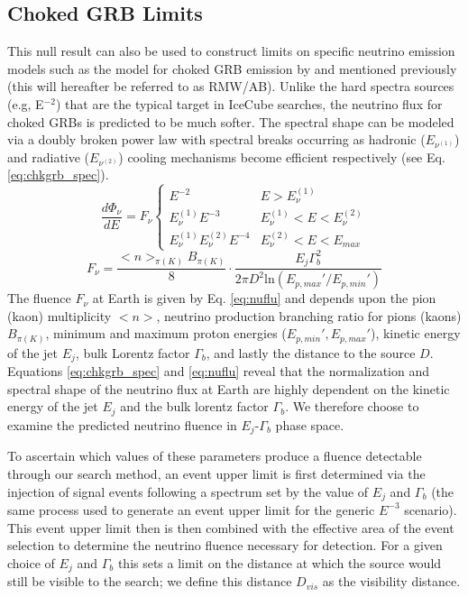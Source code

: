\documentclass[manuscript]{aastex}
\begin{document}
\subsection{Choked GRB Limits}
This null result can also be used to construct limits on specific neutrino emission models such as the model for choked GRB emission by \cite{2004PhRvL..93r1101R} and \cite{2005PhRvL..95f1103A} mentioned previously (this will hereafter be referred to as RMW/AB). Unlike the hard spectra sources (e.g, E$^{-2}$) that are the typical target in IceCube searches, the neutrino flux for choked GRBs is predicted to be much softer. The spectral shape can be modeled via a doubly broken power law with spectral breaks occurring as hadronic ($E_{\nu^{(1)}}$) and radiative ($E_{\nu^{(2)}}$) cooling mechanisms become efficient respectively (see Eq. \ref{eq:chkgrb_spec}). 
\begin{equation}\label{eq:chkgrb_spec}
\frac{d\Phi_\nu}{dE}=F_\nu\left\{\begin{array}{cc}
E^{-2} & E > E_{\nu}^{(1)} \\ 
E_{\nu}^{(1)}E^{-3} & E_{\nu}^{(1)}< E < E_{\nu}^{(2)} \\ 
E_{\nu}^{(1)}E_{\nu}^{(2)}E^{-4} & E_{\nu}^{(2)}< E < E_{max}
\end{array}\right.
\end{equation}
\begin{equation}\label{eq:nuflu}
F_{\nu} = \frac{<n>_{\pi(K)}B_{\pi(K)}}{8} \cdot \frac{E_j \Gamma_b^2}{2 \pi D^2 \textrm{ln}(E_{p,max}'/ E_{p,min}')}
\end{equation}
The fluence $F_\nu$ at Earth is given by Eq. \ref{eq:nuflu} and depends upon the pion (kaon) multiplicity $<n>$, neutrino production branching ratio for pions (kaons) $B_{\pi(K)}$, minimum and maximum proton energies ($E_{p,min}', E_{p,max}'$), kinetic energy of the jet $E_j$, bulk Lorentz factor $\Gamma_b$, and lastly the distance to the source $D$. Equations \ref{eq:chkgrb_spec} and \ref{eq:nuflu} reveal that the normalization and spectral shape of the neutrino flux at Earth are highly dependent on the kinetic energy of the jet $E_j$ and the bulk lorentz factor $\Gamma_b$. We therefore choose to examine the predicted neutrino fluence in $E_j$-$\Gamma_b$ phase space. 

To ascertain which values of these parameters produce a fluence detectable through our search method, an event upper limit is first determined via the injection of signal events following a spectrum set by the value of $E_j$ and $\Gamma_b$ (the same process used to generate an event upper limit for the generic $E^{-3}$ scenario). This event upper limit then is then combined with the effective area of the event selection to determine the neutrino fluence necessary for detection. For a given choice of $E_j$ and $\Gamma_b$ this sets a limit on the distance at which the source would still be visible to the search; we define this distance $D_{vis}$ as the visibility distance.
\end{document}
